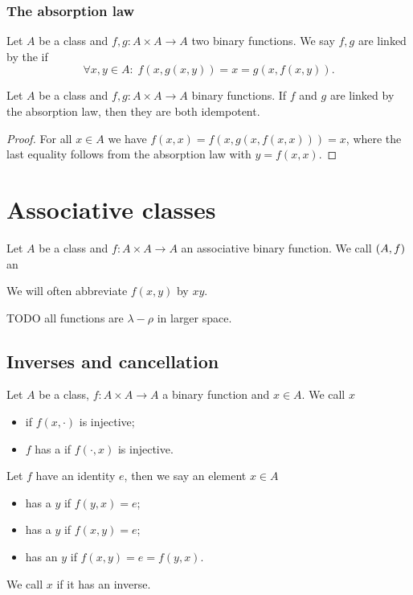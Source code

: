 \subsubsection{The absorption law}
\begin{definition}
Let $A$ be a class and $f,g: A\times A \to A$ two binary functions.
We say $f, g$ are linked by the  if
\[ \forall x,y\in A:\; f(x,g(x,y)) = x = g(x,f(x,y)). \]
\end{definition}

\begin{lemma} \label{absorptionIdempotency}
Let $A$ be a class and $f,g: A\times A\to A$ binary functions. If $f$ and $g$ are linked by the absorption law, then they are both idempotent.
\end{lemma}
\begin{proof}
For all $x\in A$ we have $f(x,x) = f(x,g(x,f(x,x))) = x$, where the last equality follows from the absorption law with $y = f(x,x)$.
\end{proof}

\section{Associative classes}
\begin{definition}
Let $A$ be a class and $f: A\times A \to A$ an associative binary function. We call $\left( A,f \right)$ an 

We will often abbreviate $f(x,y)$ by $xy$.
\end{definition}
TODO all functions are $\lambda - \rho$ in larger space.

\subsection{Inverses and cancellation}
\begin{definition}
Let $A$ be a class, $f: A\times A \to A$ a binary function and $x\in A$. 
We call $x$
\begin{itemize}
\item {} if $f(x,\cdot)$ is injective;
\item $f$ has a  if $f(\cdot, x)$ is injective.
\end{itemize}
Let $f$ have an identity $e$, then we say an element $x\in A$
\begin{itemize}
\item has a  $y$ if $f(y,x) = e$;
\item has a  $y$ if $f(x,y) = e$;
\item has an  $y$ if $f(x,y) = e = f(y,x)$.
\end{itemize}
We call $x$  if it has an inverse.
\end{definition}

